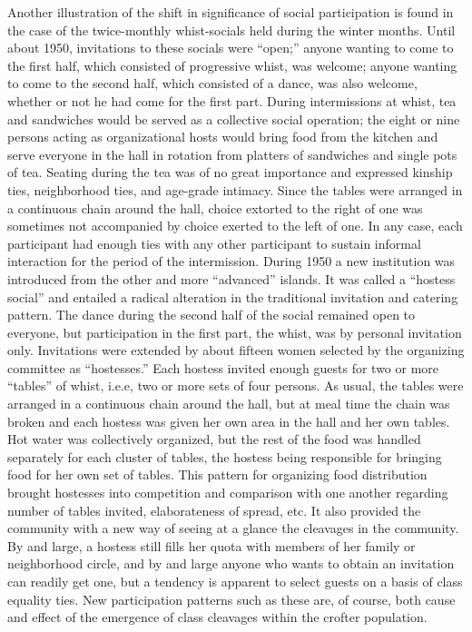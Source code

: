 \documentclass[twoside,symmetric,nobib,justified]{tufte-book}
\begin{document}
Another illustration of the shift in significance of social
participation is found in the case of the twice-monthly whist-socials
held during the winter months. Until about 1950, invitations to these
socials were ``open;'' anyone wanting to come to the first half, which
consisted of progressive whist, was welcome; anyone wanting to come to
the second half, which consisted of a dance, was also welcome, whether
or not he had come for the first part. During intermissions at whist,
tea and sandwiches would be served as a collective social operation; the
eight or nine persons acting as organizational hosts would bring food
from the kitchen and serve everyone in the hall in rotation from
platters of sandwiches and single pots of tea. Seating during the tea
was of no great importance and expressed kinship ties, neighborhood
ties, and age-grade intimacy. Since the tables were arranged in a
continuous chain around the hall, choice extorted to the right of one
was sometimes not accompanied by choice exerted to the left of one. In
any case, each participant had enough ties with any other participant to
sustain informal interaction for the period of the intermission. During
1950 a new institution was introduced from the other and more
``advanced'' islands. It was called a ``hostess social'' and entailed a
radical alteration in the traditional invitation and catering pattern.
The dance during the second half of the social remained open to
everyone, but participation in the first part, the whist, was by
personal invitation only. Invitations were extended by about fifteen
women selected by the organizing committee as ``hostesses.'' Each
hostess invited enough guests for two or more ``tables'' of whist,
i.e.e, two or more sets of four persons. As usual, the tables were
arranged in a continuous chain around the hall, but at meal time the
chain was broken and each hostess was given her own area in the hall and
her own tables. Hot water was collectively organized, but the rest of
the food was handled separately for each cluster of tables, the hostess
being responsible for bringing food for her own set of tables. This
pattern for organizing food distribution brought hostesses into
competition and comparison with one another regarding number of tables
invited, elaborateness of spread, etc. It also provided the community
with a new way of seeing at a glance the cleavages in the community. By
and large, a hostess still fills her quota with members of her family or
neighborhood circle, and by and large anyone who wants to obtain an
invitation can readily get one, but a tendency is apparent to select
guests on a basis of class equality ties. New participation patterns
such as these are, of course, both cause and effect of the emergence of
class cleavages within the crofter population.
\end{document}
